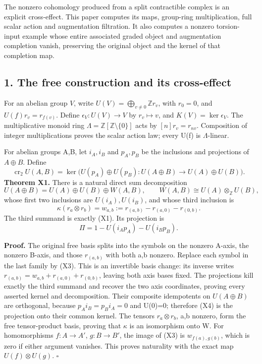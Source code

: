 \documentclass[
]{article}
\begin{document}
The nonzero cohomology produced from a split contractible complex is an
explicit cross-effect. This paper computes its maps, group-ring
multiplication, full scalar action and augmentation filtration. It also
computes a nonzero torsion-input example whose entire associated graded
object and augmentation completion vanish, preserving the original
object and the kernel of that completion map.

\subsection{1. The free construction and its
cross-effect}\label{the-free-construction-and-its-cross-effect}

For an abelian group \(V\), write
\(U(V)=\bigoplus_{v\ne0}\mathbb Zr_v\), with \(r_0=0\), and
\(U(f)r_v=r_{f(v)}\). Define \(\epsilon_V:U(V)\to V\) by
\(r_v\mapsto v\), and \(K(V)=\ker\epsilon_V\). The multiplicative monoid
ring \(\Lambda=\mathbb Z[\mathbb Z\setminus\{0\}]\) acts by
\([n]r_v=r_{nv}\). Composition of integer multiplications proves the
scalar action law; every U(f) is \(\Lambda\)-linear.

For abelian groups A,B, let \(i_A,i_B\) and \(p_A,p_B\) be the
inclusions and projections of \(A\oplus B\). Define \[
\operatorname{cr}_2U(A,B)=
\ker\bigl(U(p_A)\oplus U(p_B):U(A\oplus B)\to U(A)\oplus U(B)\bigr).
\tag{X1}
\] \textbf{Theorem X1.} There is a natural direct sum decomposition \[
U(A\oplus B)=U(A)\oplus U(B)\oplus W(A,B),
\qquad W(A,B)\cong U(A)\otimes_{\mathbb Z}U(B),
\tag{X2}
\] whose first two inclusions are \(U(i_A),U(i_B)\), and whose third
inclusion is \[
\kappa(r_a\otimes r_b)
=w_{a,b}:=r_{(a,b)}-r_{(a,0)}-r_{(0,b)}.
\tag{X3}
\] The third summand is exactly (X1). Its projection is \[
\Pi=1-U(i_Ap_A)-U(i_Bp_B).
\tag{X4}
\]

\textbf{Proof.} The original free basis splits into the symbols on the
nonzero A-axis, the nonzero B-axis, and those \(r_{(a,b)}\) with both
a,b nonzero. Replace each symbol in the last family by (X3). This is an
invertible basis change: its inverse writes
\(r_{(a,b)}=w_{a,b}+r_{(a,0)}+r_{(0,b)}\), leaving both axis bases
fixed. The projections kill exactly the third summand and recover the
two axis coordinates, proving every asserted kernel and decomposition.
Their composite idempotents on \(U(A\oplus B)\) are orthogonal, because
\(p_Ai_B=p_Bi_A=0\) and U(0)=0; therefore (X4) is the projection onto
their common kernel. The tensors \(r_a\otimes r_b\), a,b nonzero, form
the free tensor-product basis, proving that \(\kappa\) is an isomorphism
onto W. For homomorphisms \(f:A\to A'\), \(g:B\to B'\), the image of
(X3) is \(w_{f(a),g(b)}\), which is zero if either argument vanishes.
This proves naturality with the exact map \(U(f)\otimes U(g)\).
\(\square\)
\end{document}
